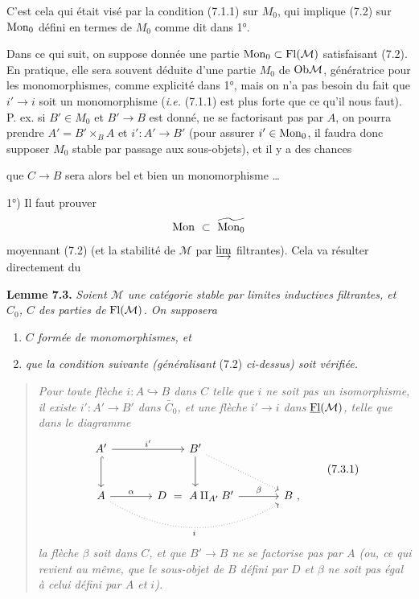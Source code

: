 C'est cela qui était visé par la condition (7.1.1) sur $M_0$, qui implique (7.2) sur $\mathrm{Mon}_0$ défini en termes de $M_0$ comme dit dans 1°.


Dans ce qui suit, on suppose donnée une partie $\mathrm{Mon}_0 \subset \mathrm{Fl}(\mathcal{M})$ satisfaisant (7.2). En pratique, elle sera souvent déduite d'une partie $M_0$ de $\mathrm{Ob} \mathcal{M}$, génératrice pour les monomorphismes, comme explicité dans 1°, mais on n'a pas besoin du fait que $i' \longrightarrow i$ soit un monomorphisme (\textit{i.e.} (7.1.1) est plus forte que ce qu'il nous faut). P. ex. si $B' \in M_0$ et $B' \longrightarrow B$ est donné, ne se factorisant pas par $A$, on pourra prendre $A' = B' \times_B A$ et $i' : A' \longrightarrow B'$ (pour assurer $i' \in \mathrm{Mon}_0$, il faudra donc supposer $M_0$ stable par passage aux sous-objets), et il y a des chances


que $C \longrightarrow B$ sera alors bel et bien un monomorphisme \ldots

1°) Il faut prouver
\[
\Mon \ \subset \ \widetilde{\Mon_0}
\]
moyennant (7.2) (et la stabilité de $\mathcal{M}$ par $\varinjlim$ filtrantes). Cela va résulter directement du

\textbf{Lemme 7.3.} \textit{Soient $\mathcal{M}$ une catégorie stable par limites inductives filtrantes, et $C_0$, $C$ des parties de} $\mathrm{Fl}(\mathcal{M})$\textit{. On supposera}
\begin{enumerate}[label={}]
\item[\cercle{a}] \textit{$C$ formée de monomorphismes, et}
\item[\cercle{b}] \textit{que la condition suivante (généralisant} (7.2) \textit{ci-dessus) soit vérifiée.}
\end{enumerate}

\begin{quote}
\textit{Pour toute flèche $i : A \hookrightarrow B$ dans $C$ telle que $i$ ne soit pas un isomorphisme, il existe $i' : A' \longrightarrow B'$ dans $\widetilde{C_0}$, et une flèche $i' \longrightarrow i$ dans} $\underline{\mathrm{Fl}}(\mathcal{M})$\textit{, telle que dans le diagramme}
\[
\begin{tikzcd}[row sep=large, column sep=large]
A' \arrow[r, "{i'}"] \arrow[d, hook] & B' \arrow[d] \arrow[rd, dotted] & \\
A \arrow[r, "\alpha"] \arrow[rr, dotted, bend right, "i"'] & D \ = \ A \amalg_{A'} B' \arrow[r, "\beta"] & B \ ,
\end{tikzcd}
\tag*{(7.3.1)}
\]
\textit{la flèche $\beta$ soit dans $C$, et que $B' \longrightarrow B$ ne se factorise pas par $A$ (ou, ce qui revient au même, que le sous-objet de $B$ défini par $D$ et $\beta$ ne soit pas égal à celui défini par $A$ et $i$).}
\end{quote}

